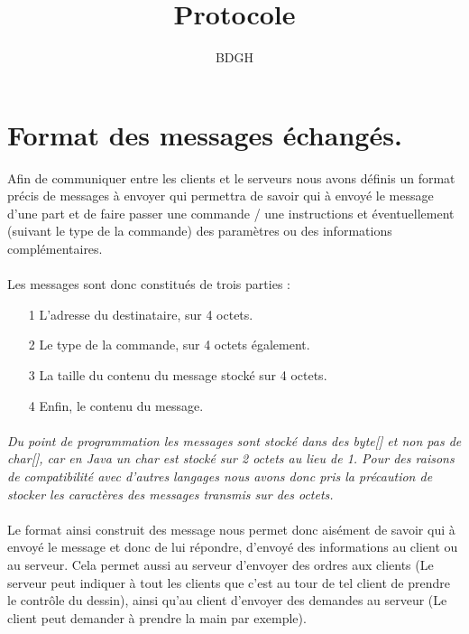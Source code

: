 \documentclass[a4paper,10pt]{article}
\title{Protocole}
\author{BDGH}
\date{}
\begin{document}
\maketitle
{}


\section{Format des messages échangés.}
Afin de communiquer entre les clients et le serveurs nous avons définis un format précis de messages à envoyer qui permettra de savoir qui à envoyé le message d'une part et de faire passer une commande / une instructions et éventuellement (suivant le type de la commande) des paramètres ou des informations complémentaires.


\paragraph{}Les messages sont donc constitués de trois parties : 
\begin{itemize}
\item[1] L'adresse du destinataire, sur 4 octets.
\item[2] Le type de la commande, sur 4 octets également.
\item[3] La taille du contenu du message stocké sur 4 octets.
\item[4] Enfin, le contenu du message.
\end{itemize}


\paragraph{}\textit{Du point de programmation les messages sont stocké dans des byte[] et non pas de char[], car en Java un char est stocké sur 2 octets au lieu de 1. Pour des raisons de compatibilité avec d'autres langages nous avons donc pris la précaution de stocker les caractères des messages transmis sur des octets.}

\paragraph{}Le format ainsi construit des message nous permet donc aisément de savoir qui à envoyé le message et donc de lui répondre, d'envoyé des informations au client ou au serveur. Cela permet aussi au serveur d'envoyer des ordres aux clients (Le serveur peut indiquer à tout les clients que c'est au tour de tel client de prendre le contrôle du dessin), ainsi qu'au client d'envoyer des demandes au serveur (Le client peut demander à prendre la main par exemple).
\end{document}
